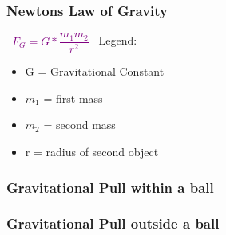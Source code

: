 \documentclass[main.tex,fontsize=8pt,paper=a4,paper=portrait,DIV=calc,]{scrartcl}
\begin{document}
\begin{multicols*}{2}
\subsubsection{Newtons Law of Gravity}
\, \newline
\large \textcolor{purple}{\( F_G = G * \dfrac{m_1m_2}{r^2} \)}\newline
\, \newline
\normalsize Legend: \newline
\begin{itemize}
\item G = Gravitational Constant
\item \(m_1\) = first mass
\item \(m_2\) = second mass
\item r = radius of second object 
\end{itemize} 


\subsubsection{Gravitational Pull within a ball}


\subsubsection{Gravitational Pull outside a ball}


\end{multicols*}
\end{document}
